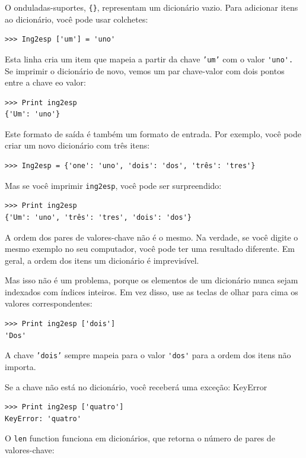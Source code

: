 \documentclass[10pt]{book}
\begin{document}
O onduladas-suportes, \verb "{}", representam um dicionário vazio.
Para adicionar itens ao dicionário, você pode usar colchetes:

\begin{verbatim}
>>> Ing2esp ['um'] = 'uno'
\end{verbatim}
%
Esta linha cria um item que mapeia a partir da chave
{\tt 'um'} com o valor \verb "'uno'." Se imprimir o
dicionário de novo, vemos um par chave-valor com dois pontos
entre a chave eo valor:

\begin{verbatim}
>>> Print ing2esp
{'Um': 'uno'}
\end{verbatim}
%
Este formato de saída é também um formato de entrada. Por exemplo,
você pode criar um novo dicionário com três itens:

\begin{verbatim}
>>> Ing2esp = {'one': 'uno', 'dois': 'dos', 'três': 'tres'}
\end{verbatim}
%
Mas se você imprimir {\tt ing2esp}, você pode ser surpreendido:

\begin{verbatim}
>>> Print ing2esp
{'Um': 'uno', 'três': 'tres', 'dois': 'dos'}
\end{verbatim}
%
A ordem dos pares de valores-chave não é o mesmo. Na verdade, se
você digite o mesmo exemplo no seu computador, você pode ter uma
resultado diferente. Em geral, a ordem dos itens
um dicionário é imprevisível.

Mas isso não é um problema, porque
os elementos de um dicionário nunca sejam indexados com índices inteiros.
Em vez disso, use as teclas de olhar para cima os valores correspondentes:

\begin{verbatim}
>>> Print ing2esp ['dois']
'Dos'
\end{verbatim}
%
A chave {\tt 'dois'} sempre mapeia para o valor \verb "'dos'" para a ordem
dos itens não importa.

Se a chave não está no dicionário, você receberá uma exceção:
\index{} KeyError

\begin{verbatim}
>>> Print ing2esp ['quatro']
KeyError: 'quatro'
\end{verbatim}
%
O {\tt len} function funciona em dicionários, que retorna o
número de pares de valores-chave:
\end{document}
